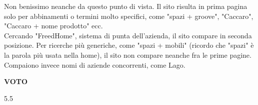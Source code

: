 Non benissimo neanche da questo punto di vista. Il sito risulta in prima pagina solo per abbinamenti o termini molto specifici, come "spazi + groove", "Caccaro", "Caccaro + nome prodotto" ecc.\\
Cercando "FreedHome", sistema di punta dell'azienda, il sito compare in seconda posizione. Per ricerche più generiche, come "spazi + mobili" (ricordo che "spazi" è la parola più usata nella home), il sito non compare neanche fra le prime pagine. Compaiono invece nomi di aziende concorrenti, come Lago.

\begin{center}
\begin{Large}
\textbf{VOTO}\\
\vspace{0.1cm}
\end{Large}
\begin{huge}
5.5
\end{huge}
\end{center}